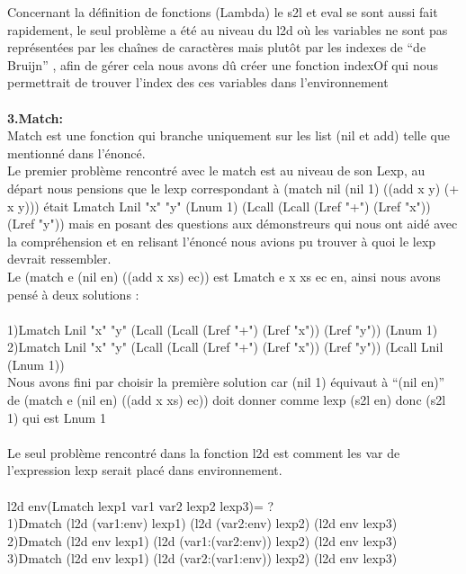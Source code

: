 \documentclass{article}
\begin{document}
\begin{enumerate}
    Concernant la définition de fonctions (Lambda) le s2l et eval se sont aussi fait rapidement, le seul problème a été au niveau du l2d où les variables ne sont pas représentées par les chaînes de caractères mais plutôt par les indexes de  “de Bruijn” , afin de gérer cela nous avons dû créer une fonction indexOf qui nous permettrait de trouver l’index des ces variables dans l’environnement \\
    \\
    
    \textbf{3.Match:}\\
    Match est une fonction qui branche uniquement sur les list (nil et add) telle que mentionné dans l’énoncé.\\
    Le premier problème rencontré avec le match est au niveau de son Lexp, au départ nous pensions que le lexp correspondant à (match nil (nil 1) ((add x y) (+ x y))) était Lmatch Lnil "x" "y" (Lnum 1) (Lcall (Lcall (Lref "+") (Lref "x")) (Lref "y")) mais en posant des questions aux démonstreurs qui nous ont aidé avec la compréhension et en relisant l’énoncé nous avions pu trouver à quoi le lexp devrait ressembler.\\
    Le (match e (nil en) ((add x xs) ec)) est Lmatch e x xs ec en, ainsi nous avons pensé à deux solutions :\\
    \\
    1)Lmatch Lnil "x" "y" (Lcall (Lcall (Lref "+") (Lref "x")) (Lref "y")) (Lnum 1)\\
    2)Lmatch Lnil "x" "y" (Lcall (Lcall (Lref "+") (Lref "x")) (Lref "y")) (Lcall Lnil (Lnum 1))\\
    Nous avons fini par choisir la première solution car (nil 1) équivaut à “(nil en)” de (match e (nil en) ((add x xs) ec)) doit donner comme lexp (s2l en) donc (s2l 1) qui est Lnum 1\\
    \\
    Le seul problème rencontré dans la fonction l2d est comment les var de l’expression lexp serait placé dans environnement.\\
    \\ l2d env(Lmatch lexp1 var1 var2 lexp2 lexp3)= ?\\
    1)Dmatch (l2d (var1:env) lexp1) (l2d (var2:env) lexp2) (l2d env lexp3)\\
    2)Dmatch (l2d env lexp1) (l2d (var1:(var2:env)) lexp2) (l2d env lexp3)\\
    3)Dmatch (l2d env lexp1) (l2d (var2:(var1:env)) lexp2) (l2d env lexp3)\\ \\

\end{enumerate}
\end{document}
